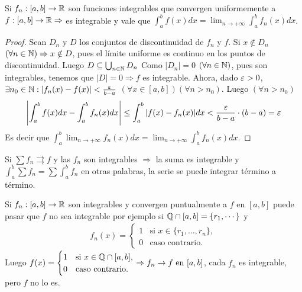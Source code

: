 \begin{theorem}
  Si \(f_n: [a, b] \to \mathbb{R} \) son funciones integrables que convergen uniformemente a \(f: [a, b] \to \mathbb{R} \Rightarrow \) es integrable y vale que \(\int_a^b f(x) dx = \lim_{n \to +\infty} \int_a^b f_n(x) dx\).
  \begin{proof}
    Sean \(D_n\) y \(D\) los conjuntos de discontinuidad de \(f_n\) y \(f\). Si \(x \notin D_n\) \((\forall n \in \mathbb{N}) \Rightarrow x \notin D\),
    pues el límite uniforme es continuo en los puntos de discontinuidad.
    Luego \(D \subseteq \bigcup_{n \in \mathbb{N}} D_n\) Como \(|D_n| = 0\) \((\forall n \in \mathbb{N})\), pues son integrables,
    tenemos que \(|D| = 0 \Rightarrow f\) es integrable. Ahora, dado \(\varepsilon > 0\),
    \(\exists n_0 \in \mathbb{N} : |f_n(x) - f(x)| < \frac{\varepsilon}{b-a} \) \((\forall x \in [a, b])(\forall n > n_0)\). Luego \((\forall n > n_0)\)
    \begin{align*}
      \left|\int_a^b f(x) dx - \int_a^b f_n(x) dx\right| \leq \int_a^b |f(x) - f_n(x)|dx < \frac{\varepsilon}{b-a} \cdot (b-a) = \varepsilon
    \end{align*}
    Es decir que \(\int_a^b \lim_{n \to +\infty} f_n(x) dx = \lim_{n \to +\infty} \int_a^b f_n(x) dx\).
  \end{proof}
\end{theorem}

\begin{corollary}
  Si \(\sum f_n \rightrightarrows f\) y las \(f_n\) son integrables \(\Rightarrow \) la suma es integrable y \(\int_a^b \sum f_n = \sum \int_a^b f_n\) en otras palabras, la serie se puede integrar término a término.
\end{corollary}

\begin{note}
  Si \(f_n: [a, b] \to \mathbb{R} \) son integrables y convergen puntualmente a \(f\) en \([a, b]\) puede pasar que \(f\) no sea integrable por ejemplo si \(\mathbb{Q} \cap [a, b] = \{r_1, \cdots \} \) y
  \begin{align*}
    f_n(x) = \begin{cases}
               1 & \text{si } x \in \{r_1, \ldots, r_n\}, \\
               0 & \text{caso contrario}.
             \end{cases}
  \end{align*}
  Luego \(f(x) = \begin{cases}
      1 & \text{si } x \in \mathbb{Q} \cap [a, b], \\
      0 & \text{caso contrario}.
    \end{cases} \Rightarrow f_n \to f \text{ en } [a, b]\), cada \(f_n\) es integrable, pero \(f\) no lo es.
\end{note}

